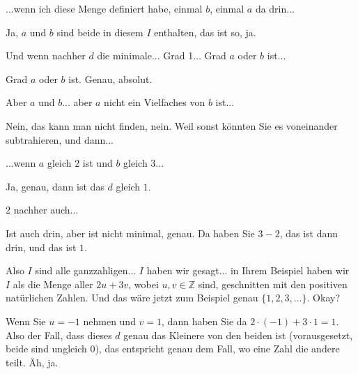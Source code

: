 \begin{student-interaction}[Studentenfrage]
...wenn ich diese Menge definiert habe, einmal $b$, einmal $a$ da drin...
\end{student-interaction}

\begin{spoken-clean}[00:26:09 - 00:26:19]
Ja, $a$ und $b$ sind beide in diesem $I$ enthalten, das ist so, ja.
\end{spoken-clean}

\begin{student-interaction}[Studentenfrage]
Und wenn nachher $d$ die minimale... Grad 1... Grad $a$ oder $b$ ist...
\end{student-interaction}

\begin{spoken-clean}[00:26:21 - 00:26:25]
Grad $a$ oder $b$ ist. Genau, absolut.
\end{spoken-clean}

\begin{student-interaction}[Studentenfrage]
Aber $a$ und $b$... aber $a$ nicht ein Vielfaches von $b$ ist...
\end{student-interaction}

\begin{spoken-clean}[00:26:26 - 00:26:36]
Nein, das kann man nicht finden, nein. Weil sonst könnten Sie es voneinander subtrahieren, und dann...
\end{spoken-clean}

\begin{student-interaction}[Studentenfrage]
...wenn $a$ gleich $2$ ist und $b$ gleich $3$...
\end{student-interaction}

\begin{spoken-clean}[00:26:37 - 00:26:40]
Ja, genau, dann ist das $d$ gleich $1$.
\end{spoken-clean}

\begin{student-interaction}[Studentenfrage]
$2$ nachher auch...
\end{student-interaction}

\begin{spoken-clean}[00:26:41 - 00:27:34]
Ist auch drin, aber ist nicht minimal, genau. Da haben Sie $3 - 2$, das ist dann drin, und das ist $1$.

Also $I$ sind alle ganzzahligen... $I$ haben wir gesagt... in Ihrem Beispiel haben wir $I$ als die Menge aller $2u + 3v$, wobei $u, v \in \mathbb{Z}$ sind, geschnitten mit den positiven natürlichen Zahlen. Und das wäre jetzt zum Beispiel genau $\{1, 2, 3, \dots\}$. Okay?

Wenn Sie $u = -1$ nehmen und $v = 1$, dann haben Sie da $2 \cdot (-1) + 3 \cdot 1 = 1$. Also der Fall, dass dieses $d$ genau das Kleinere von den beiden ist (vorausgesetzt, beide sind ungleich $0$), das entspricht genau dem Fall, wo eine Zahl die andere teilt. Äh, ja.
\end{spoken-clean}

